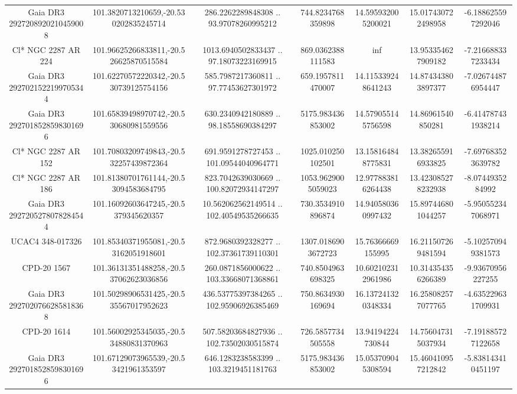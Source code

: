 \begin{table}
\begin{tabular}{ccccccc}
Gaia DR3 2927208920210459008 & 101.3820713210659,-20.530202835245714 & 286.2262289848308 .. 93.97078260995212 & 744.8234768359898 & 14.595932005200021 & 15.017430722498958 & -6.188625597292046 \\
Cl* NGC 2287     AR     224 & 101.96625266833811,-20.526625870515584 & 1013.6940502833437 .. 97.18073223169915 & 869.0362388111583 & inf & 13.953354627909182 & -7.216688337233434 \\
Gaia DR3 2927021522199705344 & 101.62270572220342,-20.530739125754156 & 585.7987217360811 .. 97.77453627301972 & 659.1957811470007 & 14.115339248641243 & 14.874343803897377 & -7.026744876954447 \\
Gaia DR3 2927018528598301696 & 101.65839498970742,-20.530680981559556 & 630.2340942180889 .. 98.18558690384297 & 5175.983436853002 & 14.579055145756598 & 14.86961540850281 & -6.414787431938214 \\
Cl* NGC 2287     AR     152 & 101.70803209749843,-20.532257439872364 & 691.9591278727453 .. 101.09544040964771 & 1025.010250102501 & 13.158164848775831 & 13.382655916933825 & -7.697683523639782 \\
Cl* NGC 2287     AR     186 & 101.81380701761144,-20.53094583684795 & 823.7042639030669 .. 100.82072934147297 & 1053.9629005059023 & 12.977883816264438 & 13.423085278232938 & -8.0744935284992 \\
Gaia DR3 2927205278078284544 & 101.16092603647245,-20.5379345620357 & 10.562062562149514 .. 102.40549535266635 & 730.3534910896874 & 14.940580360997432 & 15.897446801044257 & -5.950552347068971 \\
UCAC4 348-017326 & 101.85340371955081,-20.53162051918601 & 872.9680392328277 .. 102.37361739110301 & 1307.0186903672723 & 15.76366669155995 & 16.211507269481594 & -5.102570949381573 \\
CPD-20  1567 & 101.36131351488258,-20.537062623036856 & 260.0871856000622 .. 103.33668071368861 & 740.8504963698325 & 10.602102312961986 & 10.314354356266389 & -9.93670956227255 \\
Gaia DR3 2927020766285818368 & 101.50298906531425,-20.535567017952623 & 436.53775397384265 .. 102.95906926385469 & 750.8634930169694 & 16.137241320348334 & 16.258082577077765 & -4.635229631709931 \\
CPD-20  1614 & 101.56002925345035,-20.534880831370963 & 507.58203684827936 .. 102.73502030515874 & 726.5857734505558 & 13.94194224730844 & 14.756047315037934 & -7.191885727122658 \\
Gaia DR3 2927018528598301696 & 101.67129073965539,-20.53421961353597 & 646.1283238583399 .. 103.3219451181763 & 5175.983436853002 & 15.053709045308594 & 15.460410957212842 & -5.838143410451197 \\

\end{tabular}
\end{table}
